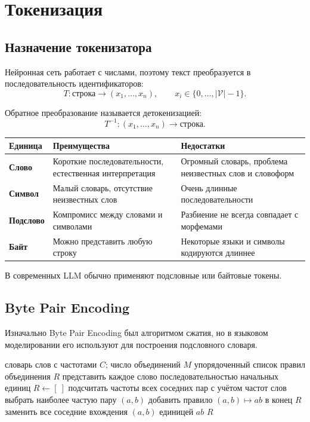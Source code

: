 \documentclass[12pt,a4paper]{article}
\newcommand{\V}{\mathcal{V}}
\newcommand{\1}{\mathbf{1}}
\theoremstyle{definition}
\theoremstyle{remark}
\begin{document}
\section{Токенизация}

\subsection{Назначение токенизатора}

Нейронная сеть работает с числами, поэтому текст преобразуется в
последовательность идентификаторов:
\[
T:\text{строка}\longrightarrow(x_1,\ldots,x_n),
\qquad x_i\in\{0,\ldots,|\V|-1\}.
\]

Обратное преобразование называется детокенизацией:
\[
T^{-1}:(x_1,\ldots,x_n)\longrightarrow\text{строка}.
\]

\begin{center}
\begin{tabularx}{\textwidth}{>{\bfseries}l X X}
\toprule
Единица & Преимущества & Недостатки \\
\midrule
Слово
& Короткие последовательности, естественная интерпретация
& Огромный словарь, проблема неизвестных слов и словоформ
\\
Символ
& Малый словарь, отсутствие неизвестных слов
& Очень длинные последовательности
\\
Подслово
& Компромисс между словами и символами
& Разбиение не всегда совпадает с морфемами
\\
Байт
& Можно представить любую строку
& Некоторые языки и символы кодируются длиннее
\\
\bottomrule
\end{tabularx}
\end{center}

В современных LLM обычно применяют подсловные или байтовые токены.

\subsection{Byte Pair Encoding}

Изначально Byte Pair Encoding был алгоритмом сжатия, но в языковом
моделировании его используют для построения подсловного словаря.

\begin{algorithm}[h]
\caption{Обучение подсловного BPE}
\begin{algorithmic}[1]
\Require словарь слов с частотами $C$; число объединений $M$
\Ensure упорядоченный список правил объединения $R$
\State представить каждое слово последовательностью начальных единиц
\State $R\gets [\ ]$
    \State подсчитать частоты всех соседних пар с учётом частот слов
    \State выбрать наиболее частую пару $(a,b)$
    \State добавить правило $(a,b)\mapsto ab$ в конец $R$
    \State заменить все соседние вхождения $(a,b)$ единицей $ab$
\EndFor
\State \Return $R$
\end{algorithmic}
\end{algorithm}
\end{document}
